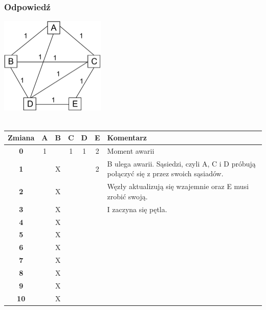\documentclass[a4paper,twoside]{article}
\begin{document}
\subsubsection{Odpowiedź}
\includegraphics[width=5.0cm]{./images/zadanie04.pdf}\\\\
\begin{tabular}{|c|c|c|c|c|c|p{7cm}|}
	\hline \textbf{Zmiana} & \textbf{A} & \textbf{B} & \textbf{C} & \textbf{D} & \textbf{E} & \textbf{Komentarz} \\ 
	\hline \textbf{0} & 1 & \color{red}{X} & 1 & 1 & 2 & Moment awarii \\ 
	\hline \textbf{1} & \color{red}{2} & X & \color{red}{2} & \color{red}{2} & 2 & B ulega awarii. Sąsiedzi, czyli A, C i D próbują połączyć się z przez swoich sąsiadów. \\ 
	\hline \textbf{2} & \color{red}{3} & X & \color{red}{3} & \color{red}{3} & \color{red}{3} & Węzły aktualizują się wzajemnie oraz E musi zrobić swoją. \\ 
	\hline \textbf{3} & \color{red}{4} & X & \color{red}{4} & \color{red}{4} & \color{red}{4} & I zaczyna się pętla. \\
	\hline \textbf{4} & \color{red}{5} & X & \color{red}{5} & \color{red}{5} & \color{red}{5} &  \\ 
	\hline \textbf{5} & \color{red}{6} & X & \color{red}{6} & \color{red}{6} & \color{red}{6} &  \\ 
	\hline \textbf{6} & \color{red}{7} & X & \color{red}{7} & \color{red}{7} & \color{red}{7} &  \\ 
	\hline \textbf{7} & \color{red}{8} & X & \color{red}{8} & \color{red}{8} & \color{red}{8} &  \\ 
	\hline \textbf{8} & \color{red}{9} & X & \color{red}{9} & \color{red}{9} & \color{red}{9} &  \\ 
	\hline \textbf{9} & \color{red}{10} & X & \color{red}{10} & \color{red}{10} & \color{red}{10} &  \\ 
	\hline \textbf{10} & \color{red}{11} & X & \color{red}{11} & \color{red}{11} & \color{red}{11} &  \\ 

\end{tabular}
\end{document}
